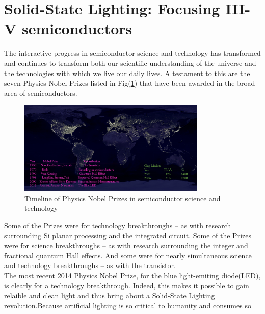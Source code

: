 
\section{Solid-State Lighting: Focusing III-V semiconductors}

The interactive progress in semiconductor science and technology has transformed and continues to transform both our scientific understanding of the universe and the technologies with which we live our daily lives\cite{LEDblue}. A testament to this are the seven Physics Nobel Prizes listed in Fig(\ref{fig:LEDnobel}) that have been awarded in the broad area of semiconductors.
\begin{figure}[htbp!] 
\centering    
\includegraphics[width=0.8\textwidth]{NASA.png}
\caption[semiconductorsNobel]{Timeline of Physics Nobel Prizes in semiconductor science and technology}
\label{fig:LEDnobel}
\end{figure}{}
Some of the Prizes were for technology
breakthroughs – as with research
surrounding Si planar processing
and the integrated circuit.
Some of the Prizes were for science
breakthroughs – as with research
surrounding the integer and
fractional quantum Hall effects. And
some were for nearly simultaneous
science and technology breakthroughs
– as with the transistor.\\
\indent The most recent 2014 Physics Nobel Prize, for the blue light-emiting diode(LED), is clearly for a technology breakthrough. Indeed, this makes it possible to gain relaible and clean light and thus bring about a Solid-State Lighting revolution.Because artificial lighting is so critical to humanity and consumes so
